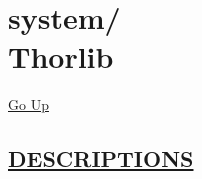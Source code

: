 \chapter*{\color{headfile}
{\large system\slash\hspace{0pt}}
 \\
Thorlib
}
\hypertarget{ecldoc:toc:system.Thorlib}{}
\hyperlink{ecldoc:toc:root/system}{Go Up}


\section*{\underline{\textsf{DESCRIPTIONS}}}
